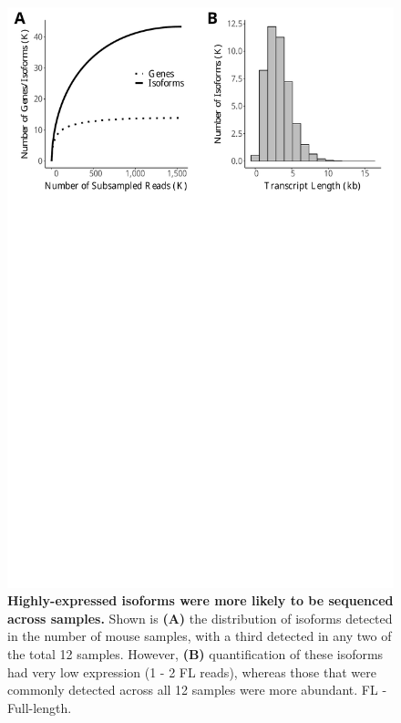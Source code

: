 \vspace{1cm}
\begin{figure}[!h]
	\begin{center}
		\includegraphics[page=2,trim={0 26cm 0 0},clip,scale = 0.55]{Figures/IsoSeqWholeTranscriptome.pdf}
	\end{center}
	\captionsetup{width=0.95\textwidth}
	\caption[Isoform diversity across the samples from global transcriptome profiling]%
	{\textbf{Highly-expressed isoforms were more likely to be sequenced across samples.} Shown is \textbf{(A)} the distribution of isoforms detected in the number of mouse samples, with a third detected in any two of the total 12 samples. However, \textbf{(B)} quantification of these isoforms had very low expression (1 - 2 FL reads), whereas those that were commonly detected across all 12 samples were more abundant. FL - Full-length.}
	\label{fig:isoseq_whole_lowlyexp}
\end{figure}

